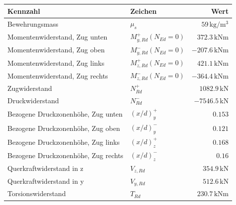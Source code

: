 \documentclass[11pt,a4paper]{article}
\begin{document}
\begin{longtable}{llr}
\hline
Kennzahl & Zeichen & Wert \\
\hline
\endhead
Bewehrungsmass & $\mu_s$ & $59\,\mathrm{kg}/\mathrm{m}^{3}$ \\
Momentenwiderstand, Zug unten & $M_{y,Rd}^{+}(N_{Ed} = 0)$ & $372.3\,\mathrm{kNm}$ \\
Momentenwiderstand, Zug oben & $M_{y,Rd}^{-}(N_{Ed} = 0)$ & $-207.6\,\mathrm{kNm}$ \\
Momentenwiderstand, Zug links & $M_{z,Rd}^{+}(N_{Ed} = 0)$ & $421.1\,\mathrm{kNm}$ \\
Momentenwiderstand, Zug rechts & $M_{z,Rd}^{-}(N_{Ed} = 0)$ & $-364.4\,\mathrm{kNm}$ \\
Zugwiderstand & $N_{Rd}^{+}$ & $1082.9\,\mathrm{kN}$ \\
Druckwiderstand & $N_{Rd}^{-}$ & $-7546.5\,\mathrm{kN}$ \\
Bezogene Druckzonenhöhe, Zug unten & $\left(x/d\right)_{y}^{+}$ & $0.153$ \\
Bezogene Druckzonenhöhe, Zug oben & $\left(x/d\right)_{y}^{-}$ & $0.121$ \\
Bezogene Druckzonenhöhe, Zug links & $\left(x/d\right)_{z}^{+}$ & $0.168$ \\
Bezogene Druckzonenhöhe, Zug rechts & $\left(x/d\right)_{z}^{-}$ & $0.16$ \\
Querkraftwiderstand in z & $V_{z,Rd}$ & $354.9\,\mathrm{kN}$ \\
Querkraftwiderstand in y & $V_{y,Rd}$ & $512.6\,\mathrm{kN}$ \\
Torsionswiderstand & $T_{Rd}$ & $230.7\,\mathrm{kNm}$ \\
\hline
\end{longtable}
\end{document}
